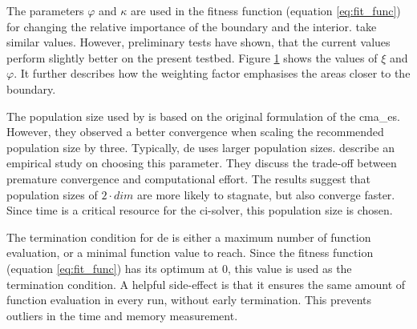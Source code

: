 \documentclass[./\jobname.tex]{subfiles}
\begin{document}
The parameters $\varphi$ and $\kappa$ are used in the fitness function (equation \eqref{eq:fit_func}) for changing the relative importance of the boundary and the interior. \cite{chaquet_using_2019} take similar values. However, preliminary tests have shown, that the current values perform slightly better on the present testbed. Figure \ref{fig:collocation_weight} shows the values of $\xi$ and $\varphi$. It further describes how the weighting factor emphasises the areas closer to the boundary. 

\begin{figure}[h]
	\centering
	\noindent{}
	\label{fig:collocation_weight}
\end{figure}

The population size used by \cite{chaquet_using_2019} is based on the original formulation of the \gls{cma_es}. However, they observed a better convergence when scaling the recommended population size by three. Typically, \gls{de} uses larger population sizes. \cite{mallipeddi_empirical_2008} describe an empirical study on choosing this parameter. They discuss the trade-off between premature convergence and computational effort. The results suggest that population sizes of $2\cdot dim$ are more likely to stagnate, but also converge faster. Since time is a critical resource for the \gls{ci}-solver, this population size is chosen. 

The termination condition for \gls{de} is either a maximum number of function evaluation, or a minimal function value to reach. Since the fitness function (equation \eqref{eq:fit_func}) has its optimum at 0, this value is used as the termination condition. A helpful side-effect is that it ensures the same amount of function evaluation in every run, without early termination. This prevents outliers in the time and memory measurement. 
\end{document}
